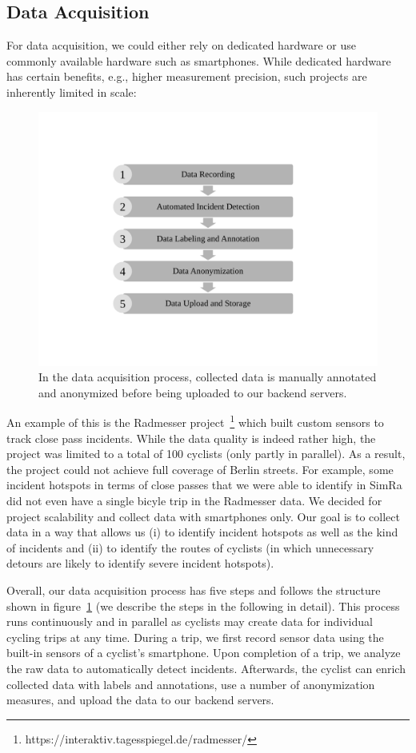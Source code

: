 \subsection{Data Acquisition}
\label{subsec:data_acquisition}
For data acquisition, we could either rely on dedicated hardware or use commonly available hardware such as smartphones.
While dedicated hardware has certain benefits, e.g., higher measurement precision, such projects are inherently limited in scale:
\begin{figure}
    \center
    \includegraphics[width=0.5\columnwidth]{fig/data_acquisition_process.pdf}
    \caption{In the data acquisition process, collected data is manually annotated and anonymized before being uploaded to our backend servers.}
    \label{fig:data_acquisition_process}
\end{figure}
An example of this is the Radmesser project~\footnote{https://interaktiv.tagesspiegel.de/radmesser/} which built custom sensors to track close pass incidents.
While the data quality is indeed rather high, the project was limited to a total of 100 cyclists (only partly in parallel).
As a result, the project could not achieve full coverage of Berlin streets.
For example, some incident hotspots in terms of close passes that we were able to identify in SimRa did not even have a single bicyle trip in the Radmesser data.
We decided for project scalability and collect data with smartphones only.
Our goal is to collect data in a way that allows us (i) to identify incident hotspots as well as the kind of incidents and (ii) to identify the routes of cyclists (in which unnecessary detours are likely to identify severe incident hotspots).


Overall, our data acquisition process has five steps and follows the structure shown in figure~\ref{fig:data_acquisition_process} (we describe the steps in the following in detail).
This process runs continuously and in parallel as cyclists may create data for individual cycling trips at any time.
During a trip, we first record sensor data using the built-in sensors of a cyclist's smartphone.
Upon completion of a trip, we analyze the raw data to automatically detect incidents.
Afterwards, the cyclist can enrich collected data with labels and annotations, use a number of anonymization measures, and upload the data to our backend servers.

